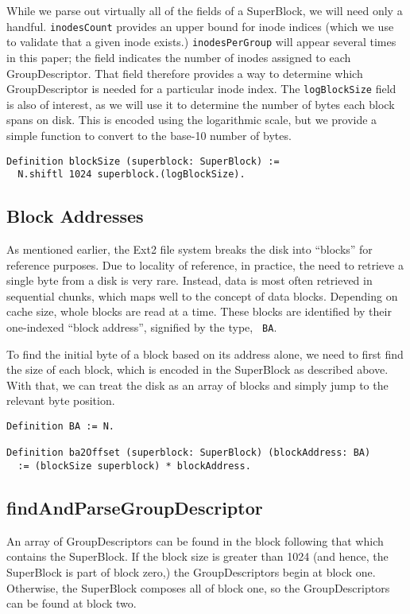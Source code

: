\documentclass[nocopyrightspace,preprint]{sigplanconf}
\begin{document}
While we parse out virtually all of the fields of a SuperBlock, we will need
only a handful. {\tt inodesCount} provides an upper bound for inode indices
(which we use to validate that a given inode exists.) {\tt inodesPerGroup}
will appear several times in this paper; the field indicates the number of
inodes assigned to each GroupDescriptor. That field therefore provides a way
to determine which GroupDescriptor is needed for a particular inode index. The
{\tt logBlockSize} field is also of interest, as we will use it to determine
the number of bytes each block spans on disk. This is encoded using the
logarithmic scale, but we provide a simple function to convert to the base-10
number of bytes.

\begin{lstlisting}
Definition blockSize (superblock: SuperBlock) := 
  N.shiftl 1024 superblock.(logBlockSize).
\end{lstlisting}

\subsection{Block Addresses}

As mentioned earlier, the Ext2 file system breaks the disk into ``blocks'' for
reference purposes. Due to locality of reference, in practice, the need to
retrieve a single byte from a disk is very rare. Instead, data is most often
retrieved in sequential chunks, which maps well to the concept of data blocks.
Depending on cache size, whole blocks are read at a time. These blocks are
identified by their one-indexed ``block address'', signified by the type, {\tt
BA}. 

To find the initial byte of a block based on its address alone, we need to
first find the size of each block, which is encoded in the SuperBlock as
described above. With that, we can treat the disk as an array of blocks and
simply jump to the relevant byte position.

\begin{lstlisting}
Definition BA := N.

Definition ba2Offset (superblock: SuperBlock) (blockAddress: BA)
  := (blockSize superblock) * blockAddress.
\end{lstlisting}

\subsection{findAndParseGroupDescriptor}
An array of GroupDescriptors can be found in the block following that which
contains the SuperBlock. If the block size is greater than 1024 (and hence,
the SuperBlock is part of block zero,) the GroupDescriptors begin at block
one. Otherwise, the SuperBlock composes all of block one, so the
GroupDescriptors can be found at block two.
\end{document}
